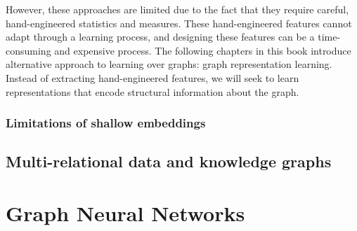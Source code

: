 However, these approaches are limited due to the fact that they require careful, hand-engineered statistics and measures. These hand-engineered features cannot adapt through a learning process, and designing these features can be a time-consuming and expensive process. The following chapters in this book introduce alternative approach to learning over graphs: graph representation learning. Instead of extracting hand-engineered features, we will seek to learn representations that encode structural information about the graph.

\subsubsection{Limitations of shallow embeddings}

\subsection{Multi-relational data and knowledge graphs}

\section{Graph Neural Networks}

